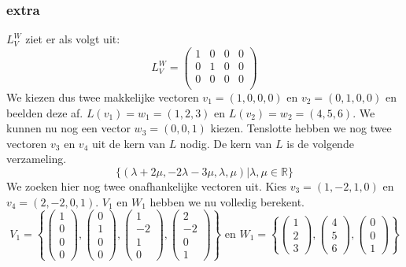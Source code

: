 \documentclass[lineaire_algebra_oplossingen.tex]{subfiles}
\begin{document}
\subsubsection*{extra}
$L_{V}^{W}$ ziet er als volgt uit:
\[
L_{V}^{W} = 
\begin{pmatrix}
1 & 0 & 0 & 0\\
0 & 1 & 0 & 0\\
0 & 0 & 0 & 0\\
\end{pmatrix}
\]
We kiezen dus twee makkelijke vectoren $v_1 = (1,0,0,0)$ en $v_2 = (0,1,0,0)$ en beelden deze af. $L(v_1) = w_1 = (1,2,3)$ en $L(v_2) = w_2 = (4,5,6)$. We kunnen nu nog een vector $w_3 = (0,0,1)$ kiezen. Tenslotte hebben we nog twee vectoren $v_3$ en $v_4$ uit de kern van $L$ nodig.
De kern van $L$ is de volgende verzameling.
\[
\{
(\lambda + 2\mu, -2\lambda -3\mu, \lambda, \mu) | \lambda,\mu \in \mathbb{R}
\}
\]
We zoeken hier nog twee onafhankelijke vectoren uit. Kies $v_3 = (1,-2,1,0)$ en $v_4 = (2,-2,0,1)$.
$V_1$ en $W_1$ hebben we nu volledig berekent.
\[
V_1 = 
\left\{
\begin{pmatrix}
1\\0\\0\\0
\end{pmatrix}
,
\begin{pmatrix}
0\\1\\0\\0
\end{pmatrix}
,
\begin{pmatrix}
1\\-2\\1\\0
\end{pmatrix}
,
\begin{pmatrix}
2\\-2\\0\\1
\end{pmatrix}
\right\}
\text{ en }
W_1 = 
\left\{
\begin{pmatrix}
1\\2\\3
\end{pmatrix}
,
\begin{pmatrix}
4\\5\\6
\end{pmatrix}
,
\begin{pmatrix}
0\\0\\1
\end{pmatrix}
\right\}
\]
\end{document}
